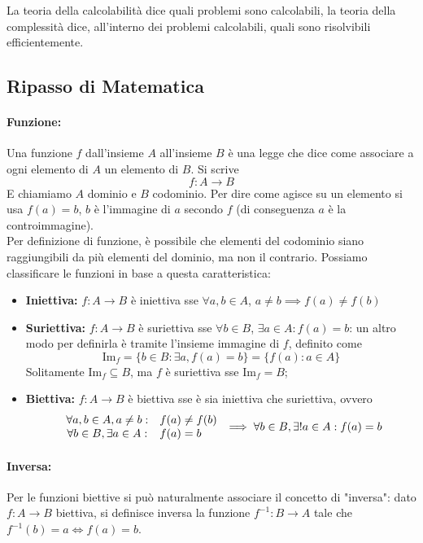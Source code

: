La teoria della calcolabilità dice quali problemi sono calcolabili, la teoria della complessità dice, all'interno dei problemi calcolabili, quali sono risolvibili efficientemente.

\newpage

\subsection{Ripasso di Matematica}

\paragraph{Funzione:} Una funzione $f$ dall'insieme $A$ all'insieme $B$ è una legge che dice come associare a ogni elemento di $A$ un elemento di $B$. Si scrive
$$ f: A \rightarrow B $$
E chiamiamo $A$ dominio e $B$ codominio. Per dire come agisce su un elemento si usa $f(a) = b$, $b$ è l'immagine di $a$ secondo $f$ (di conseguenza $a$ è la controimmagine).\\
Per definizione di funzione, è possibile che elementi del codominio siano raggiungibili da più elementi del dominio, ma non il contrario. Possiamo classificare le funzioni in base a questa caratteristica:
\begin{itemize}
	\item \textbf{Iniettiva:} $f: A \rightarrow B$ è iniettiva sse $\forall a,b \in A$, $a \neq b \implies f(a) \neq f(b)$
	\item \textbf{Suriettiva:} $f: A \rightarrow B$ è suriettiva sse $\forall b \in B$, $\exists a \in A: f(a) = b$: un altro modo per definirla è tramite l'insieme immagine di $f$, definito come
	$$ \text{Im}_f = \{b \in B: \exists a, f(a) = b \} = \{f(a): a \in A \} $$
	Solitamente $\text{Im}_f \subseteq B$, ma $f$ è suriettiva sse $\text{Im}_f = B$;
	\item \textbf{Biettiva:} $f: A \rightarrow B$ è biettiva sse è sia iniettiva che suriettiva, ovvero
	$$
	\begin{array}{c l}
		\forall a, b \in A, a \neq b: & f(a) \neq f(b) \\
		\forall b \in B, \exists a \in A: & f(a) = b
	\end{array}
	\implies \forall b \in B, \exists! a \in A: f(a) = b
	$$
\end{itemize}

\paragraph{Inversa:} Per le funzioni biettive si può naturalmente associare il concetto di "inversa": dato $f: A \rightarrow B$ biettiva, si definisce inversa la funzione $f^{-1}: B \rightarrow A$ tale che $f^{-1} (b) = a \Leftrightarrow f(a) = b$.\\

